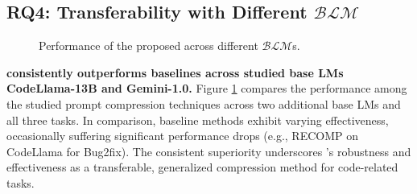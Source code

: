 

\subsection{RQ4: Transferability with Different $\mathcal{BLM}$}\label{sec:rq3}

\begin{figure}[tbp]
    \vspace{-0.2cm}
    \caption{Performance of the proposed \ourtool across different $\mathcal{BLM}$s.}
    \label{fig:llm}
    \vspace{-0.2cm}
\end{figure}

\textbf{\ourtool consistently outperforms baselines across studied base LMs CodeLlama-13B and Gemini-1.0.} Figure \ref{fig:llm} compares the performance among the studied prompt compression techniques across two additional base LMs and all three tasks. In comparison, baseline methods exhibit varying effectiveness, occasionally suffering significant performance drops (e.g., RECOMP on CodeLlama for Bug2fix). The consistent superiority underscores \ourtool’s robustness and effectiveness as a transferable, generalized compression method for code-related tasks.



